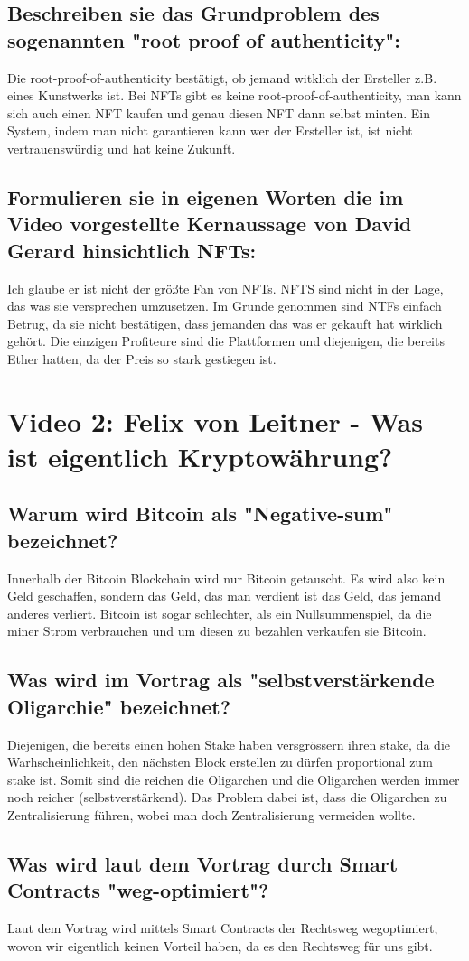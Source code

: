 \documentclass[14pt,a4paper]{extarticle}
\begin{document}
	\subsection*{Beschreiben sie das Grundproblem des sogenannten "root proof of authenticity":}
	Die root-proof-of-authenticity bestätigt, ob jemand witklich der Ersteller z.B. eines Kunstwerks ist.
	Bei NFTs gibt es keine root-proof-of-authenticity, man kann sich auch einen NFT kaufen und genau diesen NFT dann selbst minten.
	Ein System, indem man nicht garantieren kann wer der Ersteller ist, ist nicht vertrauenswürdig und hat keine Zukunft.

	\subsection*{Formulieren sie in eigenen Worten die im Video vorgestellte Kernaussage von David Gerard hinsichtlich NFTs:}
	Ich glaube er ist nicht der größte Fan von NFTs.
	NFTS sind nicht in der Lage, das was sie versprechen umzusetzen.
	Im Grunde genommen sind NTFs einfach Betrug, da sie nicht bestätigen, dass jemanden das was er gekauft hat wirklich gehört.
	Die einzigen Profiteure sind die Plattformen und diejenigen, die bereits Ether hatten, da der Preis so stark gestiegen ist.

	\pagebreak

	\section*{Video 2: Felix von Leitner - Was ist eigentlich Kryptowährung?}
	\subsection*{Warum wird Bitcoin als "Negative-sum" bezeichnet?}
	Innerhalb der Bitcoin Blockchain wird nur Bitcoin getauscht.
	Es wird also kein Geld geschaffen, sondern das Geld, das man verdient ist das Geld, das jemand anderes verliert.
	Bitcoin ist sogar schlechter, als ein Nullsummenspiel, da die miner Strom verbrauchen und um diesen zu bezahlen verkaufen sie Bitcoin.

	\subsection*{Was wird im Vortrag als "selbstverstärkende Oligarchie" bezeichnet?}
	Diejenigen, die bereits einen hohen Stake haben versgrössern ihren stake, da die Warhscheinlichkeit, den nächsten Block erstellen zu dürfen proportional zum stake ist.
	Somit sind die reichen die Oligarchen und die Oligarchen werden immer noch reicher (selbstverstärkend).
	Das Problem dabei ist, dass die Oligarchen zu Zentralisierung führen, wobei man doch Zentralisierung vermeiden wollte.

	\subsection*{Was wird laut dem Vortrag durch Smart Contracts "weg-optimiert"?}
	Laut dem Vortrag wird mittels Smart Contracts der Rechtsweg wegoptimiert, wovon wir eigentlich keinen Vorteil haben, da es den Rechtsweg für uns gibt.
\end{document}
